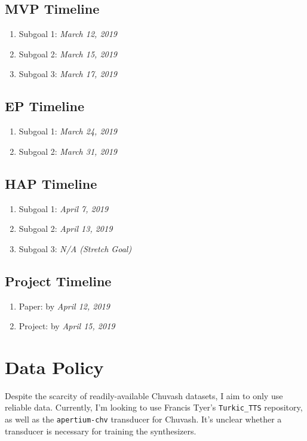 \documentclass[fleqn,10pt]{SelfArx} %
\begin{document}
\subsection{MVP Timeline}
\begin{enumerate}
	\item Subgoal 1: \textit{March 12, 2019}
	\item Subgoal 2: \textit{March 15, 2019}
	\item Subgoal 3: \textit{March 17, 2019}
\end{enumerate}

\subsection{EP Timeline}
\begin{enumerate}
	\item Subgoal 1: \textit{March 24, 2019}
	\item Subgoal 2: \textit{March 31, 2019}
\end{enumerate}

\subsection{HAP Timeline}
\begin{enumerate}
	\item Subgoal 1: \textit{April 7, 2019}
	\item Subgoal 2: \textit{April 13, 2019}
	\item Subgoal 3: \textit{N/A (Stretch Goal)}
\end{enumerate}

\subsection{Project Timeline}
\begin{enumerate}
	\item Paper: by \textit{April 12, 2019}
	\item Project: by \textit{April 15, 2019}
\end{enumerate}

\section{Data Policy}
Despite the scarcity of readily-available Chuvash datasets, I aim to only use reliable data. Currently, I'm looking to use Francis Tyer's \texttt{Turkic\_TTS} repository, as well as the \texttt{apertium-chv} transducer for Chuvash. It's unclear whether a transducer is necessary for training the synthesizers.
\end{document}
